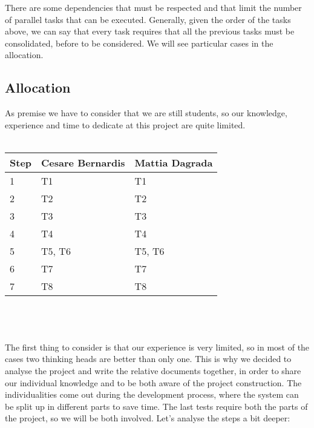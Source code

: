 There are some dependencies that must be respected and that limit the number of parallel tasks that can be executed.
Generally, given the order of the tasks above, we can say that every task requires that all the previous tasks 
must be consolidated, before to be considered. We will see particular cases in the allocation.
\subsection{Allocation}
As premise we have to consider that we are still students, so our knowledge, experience and time
to dedicate at this project are quite limited.
\\ \\
\begin{tabular}{|p{2cm}|p{5cm}|p{5cm}|} \hline
	Step & Cesare Bernardis & Mattia Dagrada \\ \hline
	1 & T1 & T1 \\ \hline
	2 & T2 & T2 \\ \hline
	3 & T3 & T3 \\ \hline
	4 & T4 & T4 \\ \hline
	5 & T5, T6 & T5, T6 \\ \hline
	6 & T7 & T7 \\ \hline
	7 & T8 & T8 \\ \hline
\end{tabular}
\\ \\ \\
The first thing to consider is that our experience is very limited, so in most of the cases two
thinking heads are better than only one. This is why we decided to analyse the project and write the
relative documents together, in order to share our individual knowledge and to be both aware of the
project construction. The individualities come out during the development process, where the system can
be split up in different parts to save time. The last tests require both the parts of the project, so
we will be both involved. Let's analyse the steps a bit deeper:
